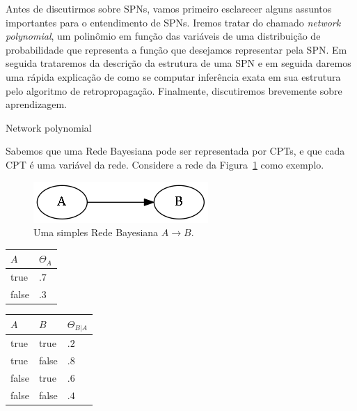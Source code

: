 \documentclass{amsart}
\makeatletter
\def\subsection{\@startsection{subsection}{3}%
  \z@{.5\linespacing\@plus.7\linespacing}{.1\linespacing}%
  {\normalfont\itshape}}
\theoremstyle{plain}
\numberwithin{equation}{subsection}
\makeatother
\begin{document}
Antes de discutirmos sobre SPNs, vamos primeiro esclarecer alguns assuntos importantes para o
entendimento de SPNs. Iremos tratar do chamado \textit{network polynomial}, um polinômio em função
das variáveis de uma distribuição de probabilidade que representa a função que desejamos
representar pela SPN\@. Em seguida trataremos da descrição da estrutura de uma SPN e em seguida
daremos uma rápida explicação de como se computar inferência exata em sua estrutura pelo algoritmo
de retropropagação. Finalmente, discutiremos brevemente sobre aprendizagem.

\subsection{Network polynomial}

Sabemos que uma Rede Bayesiana pode ser representada por CPTs, e que cada CPT é uma variável da
rede. Considere a rede da Figura~\ref{simple-bn} como exemplo.

\begin{figure}[h]
  \centering\includegraphics[scale=0.3]{graphs/simple_bn.png}
  \caption{Uma simples Rede Bayesiana $A\to B$.}\label{simple-bn}
\end{figure}

\begin{table}[h]
  \begin{center}
    \begin{tabular}{l | l}
      $A$ & $\Theta_A$ \\
      \hline
      true & $.7$ \\
      false & $.3$ \\
    \end{tabular}
    \begin{tabular}{l l | l}
      $A$ & $B$ & $\Theta_{B|A}$ \\
      \hline
      true & true & $.2$ \\
      true & false & $.8$ \\
      false & true & $.6$ \\
      false & false & $.4$ \\
    \end{tabular}
  \end{center}
\end{table}
\end{document}

